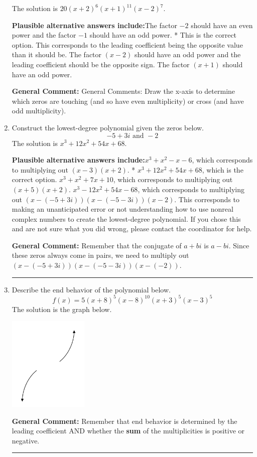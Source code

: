 \documentclass{extbook}[14pt]
\newcommand{\litem}[1]{\item #1

\rule{\textwidth}{0.4pt}}
\begin{document}
\begin{enumerate}
{The solution is \( 20(x + 2)^{6} (x + 1)^{11} (x - 2)^{7} \).\begin{enumerate}[label=\Alph*.]
\textbf{Plausible alternative answers include:}The factor $-2$ should have an even power and the factor $-1$ should have an odd power.
* This is the correct option.
This corresponds to the leading coefficient being the opposite value than it should be.
The factor $(x - 2)$ should have an odd power and the leading coefficient should be the opposite sign.
The factor $(x + 1)$ should have an odd power.
\end{enumerate}

\textbf{General Comment:} General Comments: Draw the x-axis to determine which zeros are touching (and so have even multiplicity) or cross (and have odd multiplicity).
}
\litem{
Construct the lowest-degree polynomial given the zeros below.
\[ -5 + 3 i \text{ and } -2 \]The solution is \( x^{3} +12 x^{2} +54 x + 68 \).\begin{enumerate}[label=\Alph*.]
\textbf{Plausible alternative answers include:}$x^{3} + x^{2} -x -6$, which corresponds to multiplying out $(x -3)(x + 2)$.
* $x^{3} +12 x^{2} +54 x + 68$, which is the correct option.
$x^{3} + x^{2} +7 x + 10$, which corresponds to multiplying out $(x + 5)(x + 2)$.
$x^{3} -12 x^{2} +54 x -68$, which corresponds to multiplying out $(x-(-5 + 3 i))(x-(-5 - 3 i))(x -2)$.
This corresponds to making an unanticipated error or not understanding how to use nonreal complex numbers to create the lowest-degree polynomial. If you chose this and are not sure what you did wrong, please contact the coordinator for help.
\end{enumerate}

\textbf{General Comment:} Remember that the conjugate of $a+bi$ is $a-bi$. Since these zeros always come in pairs, we need to multiply out $(x-(-5 + 3 i))(x-(-5 - 3 i))(x-(-2))$.
}
\litem{
Describe the end behavior of the polynomial below.
\[ f(x) = 5(x + 8)^{5}(x - 8)^{10}(x + 3)^{5}(x - 3)^{5} \]The solution is the graph below.
    \begin{center}
        \includegraphics[width=0.3\textwidth]{../Figures/polyEndBehaviorDA.png}
    \end{center}

\textbf{General Comment:} Remember that end behavior is determined by the leading coefficient AND whether the \textbf{sum} of the multiplicities is positive or negative.
}
\end{enumerate}
\end{document}
